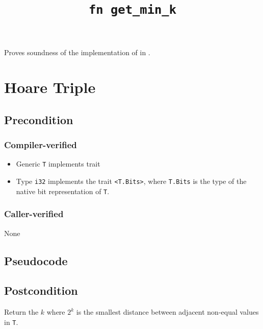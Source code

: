 \documentclass{article}
\title{\texttt{fn get\_min\_k}}
\author{\MichaelShoemateAuthor}
\date{}
\begin{document}
\maketitle

\contrib
Proves soundness of the implementation of  in .

\section{Hoare Triple}
\subsection*{Precondition}
\subsubsection*{Compiler-verified}

\begin{itemize}
    \item Generic \texttt{T} implements trait 
    \item Type \texttt{i32} implements the trait \texttt{<T.Bits>},
        where \texttt{T.Bits} is the type of the native bit representation of \texttt{T}.
\end{itemize}

\subsubsection*{Caller-verified}
None

\subsection*{Pseudocode}


\subsection*{Postcondition}
\begin{theorem}
    Return the $k$ where $2^k$ is the smallest distance between adjacent non-equal values in \texttt{T}.
\end{theorem}
\end{document}
